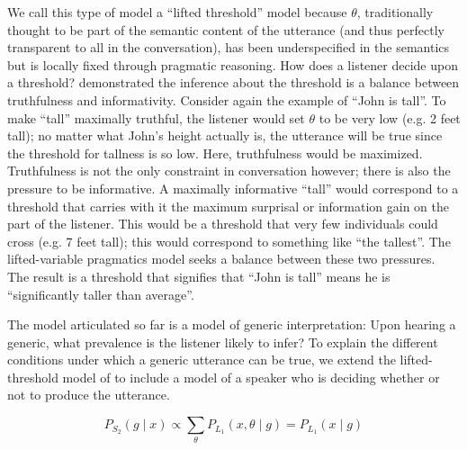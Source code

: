 \documentclass[10pt,letterpaper]{article}
\begin{document}
We call this type of model a ``lifted threshold'' model because $\theta$, traditionally thought to be part of the semantic content of the utterance (and thus perfectly transparent to all in the conversation), has been underspecified in the semantics but is locally fixed through pragmatic reasoning.
 How does a listener decide upon a threshold?  demonstrated the inference about the threshold is a balance between truthfulness and informativity. Consider again the example of ``John is tall''. To make ``tall'' maximally truthful, the listener would set $\theta$ to be very low (e.g. 2 feet tall); no matter what John's height actually is, the utterance will be true since the threshold for tallness is so low. Here, truthfulness would be maximized. 
 Truthfulness is not the only constraint in conversation however; there is also the pressure to be informative. 
 A maximally informative ``tall'' would correspond to a threshold that carries with it the maximum surprisal or information gain on the part of the listener. 
 This would be a threshold that very few individuals could cross (e.g. 7 feet tall); this would correspond to something like ``the tallest''. 
 The lifted-variable pragmatics model seeks a balance between these two pressures. 
 The result is a threshold that signifies that ``John is tall'' means he is ``significantly taller than average''.
 
% 
The model articulated so far is a model of generic interpretation: Upon hearing a generic, what prevalence is the listener likely to infer? 
To explain the different conditions under which a generic utterance can be true, we extend the lifted-threshold model of  to include a model of a speaker who is deciding whether or not to produce the utterance. 

\begin{equation} 
P_{S_{2}}(g \mid x) \propto  \sum_{\theta} P_{L_{1}}(x , \theta \mid g) =  P_{L_{1}}(x \mid g)
\label{eq:S2}
\end{equation}
\end{document}
